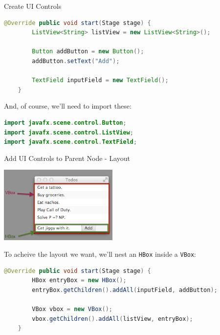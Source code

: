 \documentclass{beamer}
\begin{document}
\begin{frame}[fragile]{Create UI Controls}

\begin{lstlisting}[language=Java]
    @Override public void start(Stage stage) {
        ListView<String> listView = new ListView<String>();

        Button addButton = new Button();
        addButton.setText("Add");

        TextField inputField = new TextField();
    }
\end{lstlisting}
And, of course, we'll need to import these:
\begin{lstlisting}[language=Java]
import javafx.scene.control.Button;
import javafx.scene.control.ListView;
import javafx.scene.control.TextField;
\end{lstlisting}



\end{frame}

\begin{frame}[fragile]{Add UI Controls to Parent Node - Layout}


\begin{center}
\includegraphics[height=1.5in]{javafx-todo-nesting.png}
\end{center}

To acheive the layout we want, we'll nest an {\tt HBox} inside a {\tt VBox}:
\begin{lstlisting}[language=Java]
    @Override public void start(Stage stage) {
        HBox entryBox = new HBox();
        entryBox.getChildren().addAll(inputField, addButton);

        VBox vbox = new VBox();
        vbox.getChildren().addAll(listView, entryBox);
    }
\end{lstlisting}

\end{frame}
\end{document}
